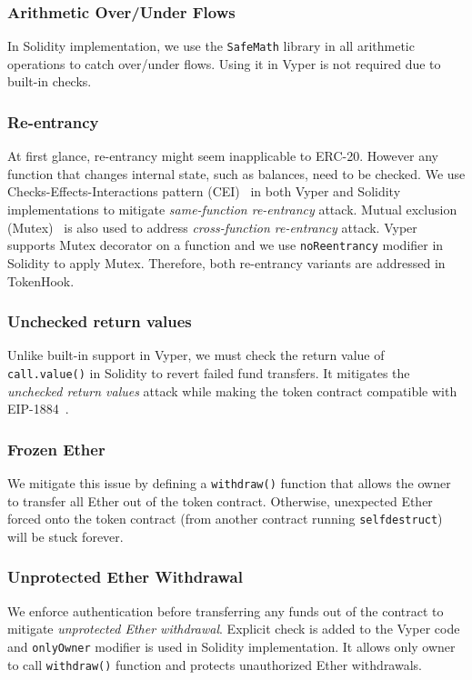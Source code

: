 \subsubsection{Arithmetic Over/Under Flows} In Solidity implementation, we use the \texttt{SafeMath} library in all arithmetic operations to catch over/under flows. Using it in Vyper is not required due to built-in checks.

\subsubsection{Re-entrancy} At first glance, re-entrancy might seem inapplicable to ERC-20. However any function that changes internal state, such as balances, need to be checked. We use Checks-Effects-Interactions pattern (CEI)~\cite{CEI} in both Vyper and Solidity implementations to mitigate \textit{same-function re-entrancy} attack. Mutual exclusion (Mutex)~\cite{WiKiMutex} is also used to address \textit{cross-function re-entrancy} attack. Vyper supports Mutex decorator on a function and we use \texttt{noReentrancy} modifier in Solidity to apply Mutex. Therefore, both re-entrancy variants are addressed in TokenHook. 

\subsubsection{Unchecked return values} Unlike built-in support in Vyper, we must check the return value of \texttt{call.value()} in Solidity to revert failed fund transfers. It mitigates the \textit{unchecked return values} attack while making the token contract compatible with EIP-1884~\cite{EIP1884}. 

\subsubsection{Frozen Ether} We mitigate this issue by defining a \texttt{withdraw()} function that allows the owner to transfer all Ether out of the token contract. Otherwise, unexpected Ether forced onto the token contract (\eg from another contract running \texttt{selfdestruct}) will be stuck forever. 

\subsubsection{Unprotected Ether Withdrawal} We enforce authentication before transferring any funds out of the contract to mitigate \textit{unprotected Ether withdrawal}. Explicit check is added to the Vyper code and \texttt{onlyOwner} modifier is used in Solidity implementation. It allows only owner to call \texttt{withdraw()} function and protects unauthorized Ether withdrawals. 

